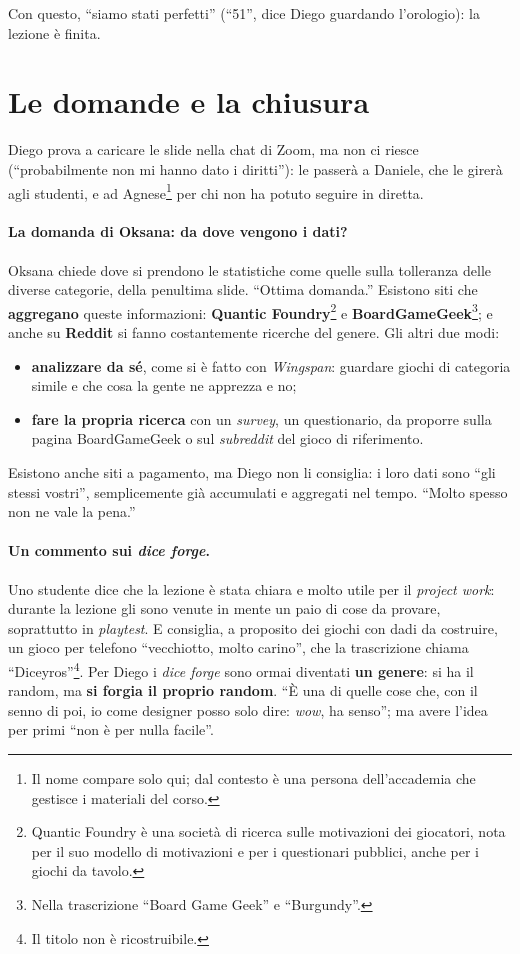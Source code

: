 Con questo, ``siamo stati perfetti'' (``51'', dice Diego guardando l'orologio): la lezione è
finita.

\section{Le domande e la chiusura}
\label{a15:sec:chiusura}

Diego prova a caricare le slide nella chat di Zoom, ma non ci riesce (``probabilmente non mi
hanno dato i diritti''): le passerà a Daniele, che le girerà agli studenti, e ad
Agnese\footnote{Il nome compare solo qui; dal contesto è una persona dell'accademia che
gestisce i materiali del corso.} per chi non ha potuto seguire in diretta.

\paragraph{La domanda di Oksana: da dove vengono i dati?} Oksana chiede dove si prendono le
statistiche come quelle sulla tolleranza delle diverse categorie, della penultima slide.
``Ottima domanda.'' Esistono siti che \textbf{aggregano} queste informazioni: \textbf{Quantic
Foundry}\footnote{Quantic Foundry è una società di ricerca sulle motivazioni dei giocatori,
nota per il suo modello di motivazioni e per i questionari pubblici, anche per i giochi da
tavolo.} e \textbf{BoardGameGeek}\footnote{Nella trascrizione ``Board Game Geek'' e
``Burgundy''.}; e anche su \textbf{Reddit} si fanno costantemente ricerche del genere. Gli
altri due modi:
\begin{itemize}
  \item \textbf{analizzare da sé}, come si è fatto con \emph{Wingspan}: guardare giochi di
        categoria simile e che cosa la gente ne apprezza e no;
  \item \textbf{fare la propria ricerca} con un \emph{survey}, un questionario, da proporre
        sulla pagina BoardGameGeek o sul \emph{subreddit} del gioco di riferimento.
\end{itemize}
Esistono anche siti a pagamento, ma Diego non li consiglia: i loro dati sono ``gli stessi
vostri'', semplicemente già accumulati e aggregati nel tempo. ``Molto spesso non ne vale la
pena.''

\paragraph{Un commento sui \emph{dice forge}.} Uno studente dice che la lezione è stata
chiara e molto utile per il \emph{project work}: durante la lezione gli sono venute in mente un
paio di cose da provare, soprattutto in \emph{playtest}. E consiglia, a proposito dei giochi
con dadi da costruire, un gioco per telefono ``vecchiotto, molto carino'', che la trascrizione
chiama ``Diceyros''\footnote{Il titolo non è ricostruibile.}. Per Diego i \emph{dice forge}
sono ormai diventati \textbf{un genere}: si ha il random, ma \textbf{si forgia il proprio
random}. ``È una di quelle cose che, con il senno di poi, io come designer posso solo dire:
\emph{wow}, ha senso''; ma avere l'idea per primi ``non è per nulla facile''.

